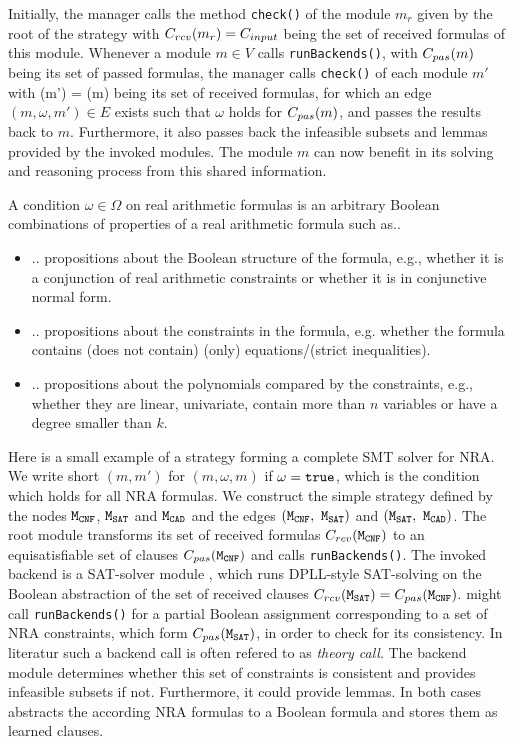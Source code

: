 Initially, the manager calls the method
\texttt{check()} of the module $m_r$ given by the root of
the strategy with $C_{rcv}(m_r) = C_{input}$ being the set of received formulas of this
module. Whenever a module $m\in V$ calls
\texttt{runBackends()}, with $C_{pas}(m)$ being its set of passed
formulas, the manager calls \texttt{check()} of each module
$m'$ with \Crcv(m') = \Cpass(m) being its set of received formulas, for which
an edge $(m, \omega, m')\in E$ exists such that $\omega$ holds for
$C_{pas}(m)$, and passes the results back to $m$. Furthermore, it also
passes back the infeasible subsets and lemmas provided by the invoked
modules. The module $m$ can now benefit in its solving and reasoning
process from this shared information. 

A condition  $\omega\in\Omega$ on real arithmetic formulas is an
arbitrary Boolean combinations of properties of a real arithmetic formula such as..
\begin{itemize}
	\item .. propositions about the Boolean structure of the formula, e.g., whether it is a conjunction of
		real arithmetic constraints or whether it is in conjunctive normal form.
	\item .. propositions about the constraints in the formula, e.g. whether the formula contains (does not contain)
		(only) equations/(strict inequalities).
	\item .. propositions about the polynomials compared by the constraints, e.g., whether they are 
		linear, univariate, contain more than $n$ variables or have a degree smaller than $k$.
\end{itemize}

Here is a small example of a strategy forming a complete SMT solver for NRA. 
We write short $(m, m')$ for $(m, \omega, m)$ if $\omega = \texttt{true}$, which
is the condition which holds for all NRA formulas. We construct the simple 
strategy defined by the nodes $\texttt{M$_\text{CNF}$}$, $\texttt{M$_\text{SAT}$}$ and $\texttt{M$_\text{CAD}$}$ 
and the edges $(\texttt{M$_\text{CNF}$},\ \texttt{M$_\text{SAT}$})$ and $(\texttt{M$_\text{SAT}$},\ \texttt{M$_\text{CAD}$})$.
The root module \CNFM transforms its set of received formulas $C_{rcv}(\texttt{M$_\text{CNF}$})$ 
to an equisatisfiable set of clauses $C_{pas}(\texttt{M$_\text{CNF}$})$ and calls 
\texttt{runBackends()}. The invoked backend is a SAT-solver module \SATM, which 
runs DPLL-style SAT-solving on the Boolean abstraction of the set of received 
clauses $C_{rcv}(\texttt{M$_\text{SAT}$})=C_{pas}(\texttt{M$_\text{CNF}$})$. \SATM might call 
\texttt{runBackends()} for a partial Boolean assignment corresponding to 
a set of NRA constraints, which form $C_{pas}(\texttt{M$_\text{SAT}$})$, in order to check for 
its consistency. In literatur such a backend call is often refered to as \emph{theory call}.
The backend module \CADM determines whether this set of constraints is consistent and 
provides infeasible subsets if not. Furthermore, it could provide lemmas. In both
cases \SATM abstracts the according NRA formulas to a Boolean formula and stores them
as learned clauses. 


